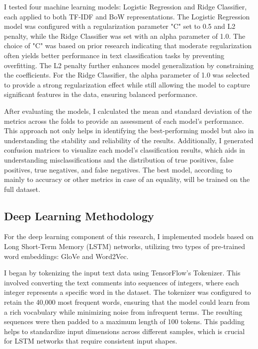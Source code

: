 I tested four machine learning models: Logistic Regression and Ridge Classifier, each applied to both TF-IDF and BoW representations. The Logistic Regression model was configured with 
a regularization parameter "C" set to 0.5 and L2 penalty, while the Ridge Classifier was set with an alpha parameter of 1.0. The choice of "C" was based on prior research indicating that 
moderate regularization often yields better performance in text classification tasks by preventing overfitting. The L2 penalty further enhances model generalization by constraining the 
coefficients. For the Ridge Classifier, the alpha parameter of 1.0 was selected to provide a strong regularization effect while still allowing the model to capture significant features 
in the data, ensuring balanced performance.

After evaluating the models, I calculated the mean and standard deviation of the metrics across the folds to provide an assessment of each model's performance. This approach not only 
helps in identifying the best-performing model but also in understanding the stability and reliability of the results. Additionally, I generated confusion matrices to visualize each 
model's classification results, which aids in understanding misclassifications and the distribution of true positives, false positives, true negatives, and false negatives. 
The best model, according to mainly to accuracy or other metrics in case of an equality, will be trained on the full dataset.

\subsection{Deep Learning Methodology}

For the deep learning component of this research, I implemented models based on Long Short-Term Memory (LSTM) networks, utilizing two types of pre-trained word embeddings: 
GloVe and Word2Vec.

I began by tokenizing the input text data using TensorFlow's Tokenizer. This involved converting the text comments into sequences of integers, where each integer represents a specific 
word in the dataset. The tokenizer was configured to retain the 40,000 most frequent words, ensuring that the model could learn from a rich vocabulary while minimizing noise from 
infrequent terms. The resulting sequences were then padded to a maximum length of 100 tokens. This padding helps to standardize input dimensions across different samples, which is 
crucial for LSTM networks that require consistent input shapes.

